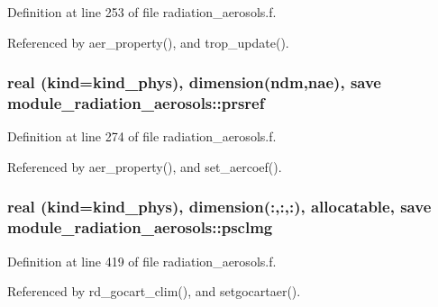 Definition at line 253 of file radiation\+\_\+aerosols.\+f.



Referenced by aer\+\_\+property(), and trop\+\_\+update().

\subsubsection[{\texorpdfstring{prsref}{prsref}}]{\setlength{\rightskip}{0pt plus 5cm}real (kind=kind\+\_\+phys), dimension({\bf ndm},{\bf nae}), save module\+\_\+radiation\+\_\+aerosols\+::prsref\hspace{0.3cm}{\ttfamily [private]}}\hypertarget{namespacemodule__radiation__aerosols_a274fad1b6e00e66375882e32494d61c0}{}\label{namespacemodule__radiation__aerosols_a274fad1b6e00e66375882e32494d61c0}


Definition at line 274 of file radiation\+\_\+aerosols.\+f.



Referenced by aer\+\_\+property(), and set\+\_\+aercoef().

\subsubsection[{\texorpdfstring{psclmg}{psclmg}}]{\setlength{\rightskip}{0pt plus 5cm}real (kind=kind\+\_\+phys), dimension(\+:,\+:,\+:), allocatable, save module\+\_\+radiation\+\_\+aerosols\+::psclmg\hspace{0.3cm}{\ttfamily [private]}}\hypertarget{namespacemodule__radiation__aerosols_a942aa3a9f61cb40592bd0879a91c2ede}{}\label{namespacemodule__radiation__aerosols_a942aa3a9f61cb40592bd0879a91c2ede}


Definition at line 419 of file radiation\+\_\+aerosols.\+f.



Referenced by rd\+\_\+gocart\+\_\+clim(), and setgocartaer().

